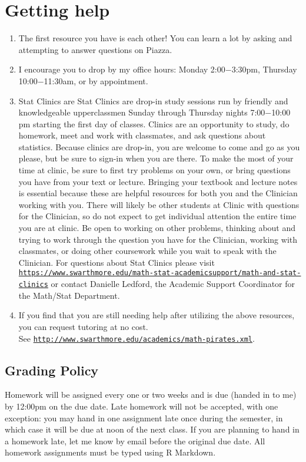 \documentclass[11pt]{article}
\begin{document}
	\section*{Getting help}
	\begin{enumerate}
		\item The first resource you have is each other! You can learn a lot by asking and attempting to answer questions on Piazza. 
		\item I encourage you to drop by my office hours: Monday 2:00$-$3:30pm, Thursday 10:00$-$11:30am, or by appointment.
		\item Stat Clinics are Stat Clinics are drop-in study sessions run by friendly and knowledgeable upperclassmen Sunday through Thursday nights 7:00$-$10:00 pm starting the first day of classes. Clinics are an opportunity to study, do homework, meet and work with classmates, and ask questions about statistics. Because clinics are drop-in, you are welcome to come and go as you please, but be sure to sign-in when you are there. To make the most of your time at clinic, be sure to first try problems on your own, or bring questions you have from your text or lecture. Bringing your textbook and lecture notes is essential because these are helpful resources for both you and the Clinician working with you. There will likely be other students at Clinic with questions for the Clinician, so do not expect to get individual attention the entire time you are at clinic. Be open to working on other problems, thinking about and trying to work through the question you have for the Clinician, working with classmates, or doing other coursework while you wait to speak with the Clinician. For questions about Stat Clinics please visit
		\href{https://www.swarthmore.edu/math-stat-academicsupport/math-and-stat-clinics}{\tt https://www.swarthmore.edu/math-stat-academicsupport/math-and-stat-clinics}  or contact Danielle Ledford, the Academic Support Coordinator for the Math/Stat Department.
		\item If you find that you are still needing help after utilizing the above resources, you can request tutoring at no cost. \\ 
		See \href{http://www.swarthmore.edu/academics/math-pirates.xml}{\tt http://www.swarthmore.edu/academics/math-pirates.xml}.
	\end{enumerate}

	
	\subsection*{Grading Policy}
Homework will be assigned every one or two weeks and is due (handed in to me) by 12:00pm on the due date. Late homework will not be accepted, with one exception: you may hand in one assignment late once during the semester, in which case it will be due at noon of the next class. If you are planning to hand in a homework late, let me know by email before the original due date. All homework assignments must be typed using R Markdown. 
\end{document}
